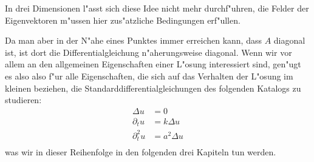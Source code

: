 In drei Dimensionen l"asst sich diese Idee nicht mehr durchf"uhren,
die Felder der Eigenvektoren m"ussen hier zus"atzliche Bedingungen
erf"ullen.

Da man aber in der N"ahe eines Punktes immer erreichen kann, dass $A$ diagonal
ist, ist dort die Differentialgleichung n"aherungsweise diagonal.
Wenn wir vor allem an den allgemeinen Eigenschaften einer L"osung interessiert
sind, gen"ugt es also
also f"ur alle Eigenschaften, die sich auf das Verhalten der L"osung im kleinen
beziehen, die Standarddifferentialgleichungen des folgenden Katalogs
zu studieren:
\begin{align*}
\Delta u&=0\\
\partial_tu&=k\Delta u\\
\partial_t^2u&=a^2\Delta u\\
\end{align*}
was wir in dieser Reihenfolge in den folgenden drei Kapiteln tun
werden.

